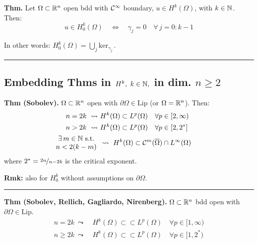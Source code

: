 \smallskip

\textbf{Thm.} Let $\Omega\subset\mathbb{R}^n$ open bdd with $\mathcal{C}^\infty$ boundary, $u\in H^k(\Omega)$, with $k\in\mathbb{N}$. Then:
\begin{equation*}
u\in H^k_0(\Omega) \quad\Longleftrightarrow\quad \gamma_j=0\quad\forall\,j=0:k-1
\end{equation*}

In other words: $H^k_0(\Omega)=\displaystyle\bigcup_j\text{ker}_{\gamma_j}\,.$

\rule{0.31\textwidth}{0.2pt}


\subsection{\color{red}Embedding Thms in \texorpdfstring{$H^k,\ k\in\mathbb{N},$}{C} in dim. \texorpdfstring{$n\geq 2$}{C}}


\textbf{Thm (Sobolev).} $\Omega\subset \mathbb{R}^n$ open with $\partial\Omega\in\text{Lip}$ (or $\Omega=\mathbb{R}^n$). Then:
\begin{align*}
n=2k\ \leadsto\ &H^k(\Omega)\subset L^p(\Omega)\quad \forall p\in [2,\infty) \\
n>2k\ \leadsto\ &H^k(\Omega)\subset L^p(\Omega)\quad \forall p\in [2,2^*] \\
\begin{array}{c}
\exists\, m\in\mathbb{N}\text{ s.t.}\\
n<2(k-m)   
\end{array}& 
\leadsto\ H^k(\Omega)\subset \mathcal{C}^m(\overline{\Omega})\cap L^\infty(\Omega)\qquad
\end{align*}
where $2^*=\nicefrac{2n}{n-2k}$ is the critical exponent.

\smallskip

\textbf{Rmk:} also for $H^k_0$ without assumptions on $\partial\Omega$.

\rule{0.31\textwidth}{0.2pt}
\smallskip

\textbf{Thm (Sobolev, Rellich, Gagliardo, Nirenberg).} $\Omega\subset \mathbb{R}^n$ bdd open with $\partial\Omega\in\text{Lip}$.
\begin{align*}
n=2k\ \leadsto\ &H^k(\Omega)\subset\subset L^p(\Omega)\quad \forall p\in [1,\infty) \\
n\geq 2k\ \leadsto\ &H^k(\Omega)\subset\subset L^p(\Omega)\quad \forall p\in [1,2^*)
\end{align*}

